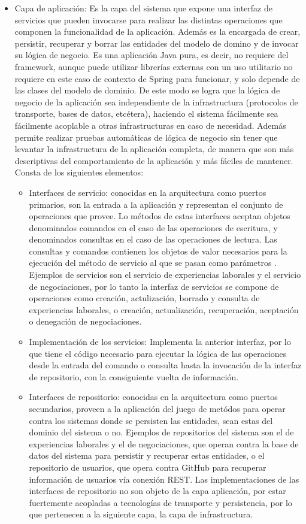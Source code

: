 \documentclass[a4paper, 12pt]{book}
\begin{document}
\begin{itemize}
  \item Capa de aplicación: Es la capa del sistema que expone una interfaz de servicios que pueden invocarse para realizar las distintas operaciones que componen la funcionalidad de la aplicación. Además es la encargada de crear, persistir, recuperar y borrar las entidades del modelo de domino y de invocar su lógica de negocio.
Es una aplicación Java pura, es decir, no requiere del framework, aunque puede utilizar librerías externas con un uso utilitario no requiere en este caso de contexto de Spring para funcionar, y solo depende de las clases del modelo de dominio.
De este modo se logra que la lógica de negocio de la aplicación sea independiente de la infrastructura (protocolos de transporte, bases de datos, etcétera), haciendo el sistema fácilmente sea fácilmente acoplable a otras infrastructuras en caso de necesidad.
Además permite realizar pruebas automáticas de lógica de negocio sin tener que levantar la infrastructura de la aplicación completa, de manera que son más descriptivas del comportamiento de la aplicación y más fáciles de mantener.
Consta de los siguientes elementos:

	\begin{itemize}
	\item Interfaces de servicio: conocidas en la arquitectura como puertos primarios, son la entrada a la aplicación y representan el conjunto de operaciones que provee. Lo métodos de estas interfaces aceptan objetos denominados comandos en el caso de las operaciones de escritura, y denominados consultas en el caso de las operaciones de lectura.
	Las consultas y comandos contienen los objetos de valor necesarios para la ejecución del método de servicio al que se pasan como parámetros
	. Ejemplos de servicios son el servicio de experiencias laborales y el servicio de negociaciones, por lo tanto la interfaz de servicios se compone de operaciones como creación, actulización, borrado y consulta de experiencias laborales,
	o creación, actualización, recuperación, aceptación o denegación de negociaciones.
	\item Implementación de los servicios: Implementa la anterior interfaz, por lo que tiene el código necesario para ejecutar la lógica de las operaciones desde la entrada del comando o consulta hasta la invocación de la interfaz de repositorio, con la consiguiente vuelta de información.
	\item Interfaces de repositorio: conocidas en la arquitectura como puertos secundarios, proveen a la aplicación del juego de metódos para operar contra los sistemas donde se persisten las entidades, sean estas del dominio del sistema o no.
	Ejemplos de repositorios del sistema son el de experiencias laborales y el de negociaciones, que operan contra la base de datos del sistema para persistir y recuperar estas entidades, o el repositorio de usuarios, que opera contra GitHub para recuperar información de usuarios vía conexión REST.
	Las implementaciones de las interfaces de repositorio no son objeto de la capa aplicación, por estar fuertemente acopladas a tecnologías de transporte y persistencia, por lo que pertenecen a la siguiente capa, la capa de infrastructura.
	\end{itemize}



\end{itemize}
\end{document}
